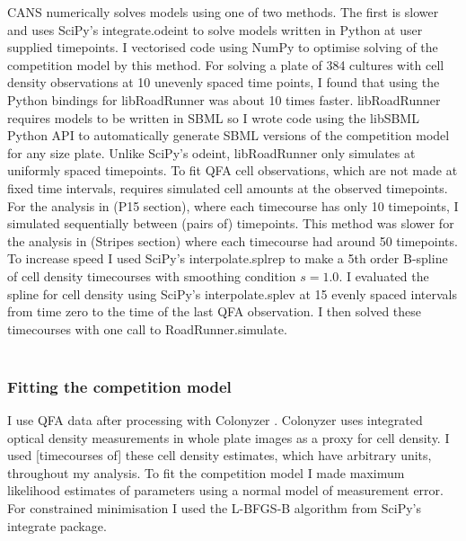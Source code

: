 CANS numerically solves models using one of two methods. The first is
slower and uses SciPy's integrate.odeint to solve models written in
Python at user supplied timepoints. I vectorised code using NumPy to
optimise solving of the competition model by this method. For solving
a plate of 384 cultures with cell density observations at 10 unevenly
spaced time points, I found that using the Python bindings for
libRoadRunner was about 10 times faster. libRoadRunner requires models
to be written in SBML so I wrote code using the libSBML Python API to
automatically generate SBML versions of the competition model for any
size plate.
Unlike SciPy's odeint, libRoadRunner only simulates at uniformly
spaced timepoints. To fit QFA cell observations, which are not made at
fixed time intervals, requires simulated cell amounts at the observed
timepoints. For the analysis in (P15 section), where each timecourse
has only 10 timepoints, I simulated sequentially between (pairs of)
timepoints. This method was slower for the analysis in (Stripes
section) where each timecourse had around 50 timepoints. To increase
speed I used SciPy's interpolate.splrep to make a 5th order B-spline
of cell density timecourses with smoothing condition \(s=1.0\). I
evaluated the spline for cell density using SciPy's interpolate.splev
at 15 evenly spaced intervals from time zero to the time of the last
QFA observation. I then solved these
timecourses with one call to RoadRunner.simulate.\\\\

\subsubsection{Fitting the competition model}
\label{sec:fitting_comp}

I use QFA data after processing with Colonyzer \citep{Lawless2010}.
Colonyzer uses integrated optical density measurements in whole plate
images as a proxy for cell density. I used [timecourses of] these cell
density estimates, which have arbitrary units, throughout my
analysis. To fit the competition model I made maximum likelihood
estimates of parameters using a normal model of measurement error.
For constrained minimisation I used the L-BFGS-B algorithm from
SciPy's integrate package.


